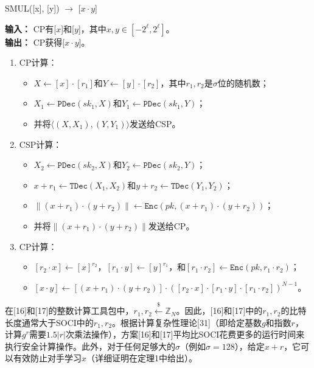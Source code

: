 \begin{algorithm}
\caption{SMUL([x], [y]) \(\rightarrow\) [\(x\cdot y\)]}
\textbf{输入：} CP有[\(x\)]和[\(y\)]，其中\(x,y\in[-2^{\ell},2^{\ell}]\)。\\
\textbf{输出：} CP获得[\(x\cdot y\)]。
\begin{enumerate}
    \item CP计算：
    \begin{itemize}
        \item \(X\leftarrow[x]\cdot[r_{1}]\)和\(Y\leftarrow[y]\cdot[r_{2}]\)，其中\(r_{1},r_{2}\)是\(\sigma\)位的随机数；
        \item \(X_{1}\leftarrow\texttt{PDec}(sk_{1},X)\)和\(Y_{1}\leftarrow\texttt{PDec}(sk_{1},Y)\)；
        \item 并将\(\langle(X,X_{1}),(Y,Y_{1})\rangle\)发送给CSP。
    \end{itemize}
    \item CSP计算：
    \begin{itemize}
        \item \(X_{2}\leftarrow\texttt{PDec}(sk_{2},X)\)和\(Y_{2}\leftarrow\texttt{PDec}(sk_{2},Y)\)；
        \item \(x+r_{1}\leftarrow\texttt{TDec}(X_{1},X_{2})\)和\(y+r_{2}\leftarrow\texttt{TDec}(Y_{1},Y_{2})\)；
        \item \(\|(x+r_{1})\cdot(y+r_{2})\|\leftarrow\texttt{Enc}(pk,(x+r_{1})\cdot(y+r_{2}))\)；
        \item 并将\(\|(x+r_{1})\cdot(y+r_{2})\|\)发送给CP。
    \end{itemize}
    \item CP计算：
    \begin{itemize}
        \item \([r_{2}\cdot x]\leftarrow[x]^{r_{2}}\)，\([r_{1}\cdot y]\leftarrow[y]^{r_{1}}\)，和\([r_{1}\cdot r_{2}]\leftarrow\texttt{Enc}(pk,r_{1}\cdot r_{2})\)；
        \item \([x\cdot y]\leftarrow[(x+r_{1})\cdot(y+r_{2})]\cdot([r_{2}\cdot x]\cdot[r_{1}\cdot y]\cdot[r_{1}\cdot r_{2}])^{N-1}\)。
    \end{itemize}
\end{enumerate}
\end{algorithm}

在[16]和[17]的整数计算工具包中，\( r_{1},r_{2}\overset{\$}{\leftarrow}\mathbb{Z}_{N} \)。因此，[16]和[17]中的\( r_{1},r_{2} \)的比特长度通常大于SOCI中的\( r_{1},r_{2} \)。根据计算复杂性理论[31]（即给定基数\( g \)和指数\( r \)，计算\( g^{r} \)需要\( 1.5|r| \)次乘法操作），方案[16]和[17]平均比SOCI花费更多的运行时间来执行安全计算操作。此外，对于任何足够大的\(\sigma\)（例如\(\sigma=128\)），给定\( x+r \)，它可以有效防止对手学习\( x \)（详细证明在定理1中给出）。

